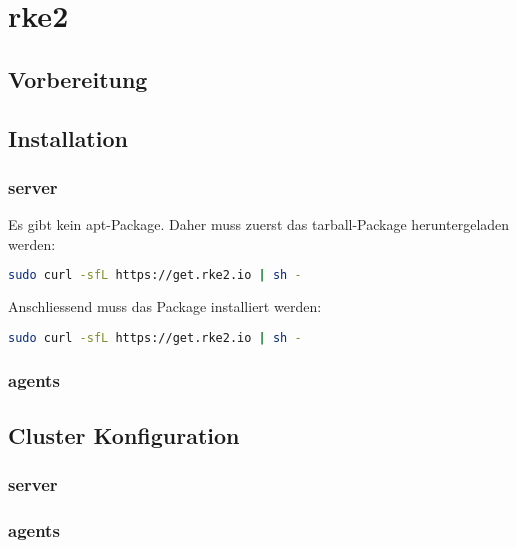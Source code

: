 
\section{rke2}
\subsection{Vorbereitung}
\subsection{Installation}
\subsubsection{server}
Es gibt kein apt-Package.
Daher muss zuerst das tarball-Package heruntergeladen werden:
\lstset{style=gra_codestyle}
\begin{lstlisting}[language=bash, caption=Downlaod rke2,captionpos=b,label={lst:download-rke2},breaklines=true]
sudo curl -sfL https://get.rke2.io | sh -
\end{lstlisting}
Anschliessend muss das Package installiert werden:
\lstset{style=gra_codestyle}
\begin{lstlisting}[language=bash, caption=Downlaod rke2,captionpos=b,label={lst:download-rke2},breaklines=true]
sudo curl -sfL https://get.rke2.io | sh -
\end{lstlisting}


\subsubsection{agents}
\subsection{Cluster Konfiguration}
\subsubsection{server}
\subsubsection{agents}